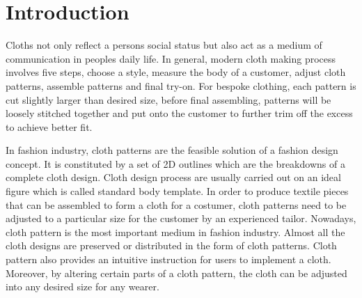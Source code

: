 
\ifx\isEmbedded\undefined

\graphicspath{{../images/}}

\fi

\chapter{Introduction}
\label{cha:introduction}
Cloths not only reflect a persons social status but also act as a medium of communication in peoples daily life. In general, modern cloth making process involves five steps, choose a style, measure the body of a customer, adjust cloth patterns, assemble patterns and final try-on. For bespoke clothing, each pattern is cut slightly larger than desired size, before final assembling, patterns will be loosely stitched together and put onto the customer to further trim off the excess to achieve better fit. 

In fashion industry, cloth patterns are the feasible solution of a fashion design concept. It is constituted by a set of 2D outlines which are the breakdowns of a complete cloth design. Cloth design process are usually carried out on an ideal figure which is called standard body template. In order to produce textile pieces that can be assembled to form a cloth for a costumer, cloth patterns need to be adjusted to a particular size for the customer by an experienced tailor. Nowadays, cloth pattern is the most important medium in fashion industry. Almost all the cloth designs are preserved or distributed in the form of cloth patterns. Cloth pattern also provides an intuitive instruction for users to implement a cloth. Moreover, by altering certain parts of a cloth pattern, the cloth can be adjusted into any desired size for any wearer. 


